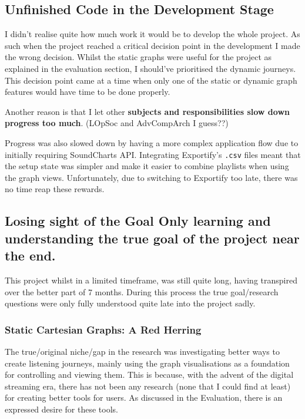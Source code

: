 \subsection{Unfinished Code in the Development Stage}
I didn't realise quite how much work it would be to develop the whole project. As such when the project reached a critical decision point in the development I made the wrong decision. Whilst the static graphs were useful for the project as explained in the evaluation section, I should've prioritised the dynamic journeys. This decision point came at a time when only one of the static or dynamic graph features would have time to be done properly.

Another reason is that I let other \textbf{subjects and responsibilities slow down progress too much}. (LOpSoc and AdvCompArch I guess??)

Progress was also slowed down by having a more complex application flow due to initially requiring SoundCharts API. Integrating Exportify's \lstinline|.csv| files meant that the setup state was simpler and make it easier to combine playlists when using the graph views. Unfortunately, due to switching to Exportify too late, there was no time reap these rewards.

\subsection{
    Losing sight of the Goal
    Only learning and understanding the true goal of the project near the end.
}%

This project whilst in a limited timeframe, was still quite long, having transpired over the better part of 7 months. During this process the true goal/research questions were only fully understood quite late into the project sadly.

\subsubsection{Static Cartesian Graphs: A Red Herring}
The true/original niche/gap in the research was investigating better ways to create listening journeys, mainly using the graph visualisations as a foundation for controlling and viewing them. This is because, with the advent of the digital streaming era, there has not been any research (none that I could find at least) for creating better tools for users. As discussed in the Evaluation, there is an expressed desire for these tools.

